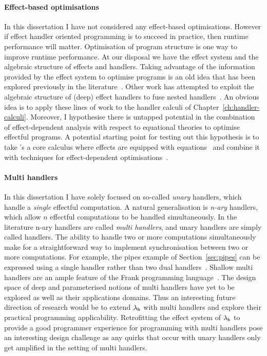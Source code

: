 \documentclass[12pt,phd,lfcs,twoside,openright,logo,leftchapter,normalheadings]{infthesis}
\theoremstyle{plain}
\theoremstyle{definition}
\begin{document}
\paragraph{Effect-based optimisations} In this dissertation I have not
considered any effect-based optimisations. However if effect handler
oriented programming is to succeed in practice, then runtime
performance will matter. Optimisation of program structure is one way
to improve runtime performance. At our disposal we have the effect
system and the algebraic structure of effects and handlers.
%
Taking advantage of the information provided by the effect system to
optimise programs is an old idea that has been explored previously in
the literature~\cite{KammarP12,Kammar14,Saleh19}.
%
Other work has attempted to exploit the algebraic structure of (deep)
effect handlers to fuse nested handlers~\cite{WuS15}.
%
An obvious idea is to apply these lines of work to the handler calculi
of Chapter~\ref{ch:handler-calculi}.
%
Moreover, I hypothesise there is untapped potential in the combination
of effect-dependent analysis with respect to equational theories to
optimise effectful programs. A potential starting point for testing
out this hypothesis is to take \citeauthor{LuksicP20}'s a core
calculus where effects are equipped with equations~\cite{LuksicP20}
and combine it with techniques for effect-dependent
optimisations~\cite{KammarP12}.

\paragraph{Multi handlers} In this dissertation I have solely focused
on so-called \emph{unary} handlers, which handle a \emph{single}
effectful computation. A natural generalisation is \emph{n-ary}
handlers, which allow $n$ effectful computations to be handled
simultaneously. In the literature n-ary handlers are called
\emph{multi handlers}, and unary handlers are simply called
handlers. The ability to handle two or more computations
simultaneously make for a straightforward way to implement
synchronisation between two or more computations. For example, the
pipes example of Section~\ref{sec:pipes} can be expressed using a
single handler rather than two dual
handlers~\cite{LindleyMM17}. Shallow multi handlers are an ample
feature of the Frank programming language~\cite{LindleyMM17}.  The
design space of deep and parameterised notions of multi handlers have
yet to be explored as well as their applications domains. Thus an
interesting future direction of research would be to extend $\lambda_{\mathsf{h}}$
with multi handlers and explore their practical programming
applicability. Retrofitting the effect system of $\lambda_{\mathsf{h}}$ to provide a
good programmer experience for programming with multi handlers pose an
interesting design challenge as any quirks that occur with unary
handlers only get amplified in the setting of multi handlers.
\end{document}
